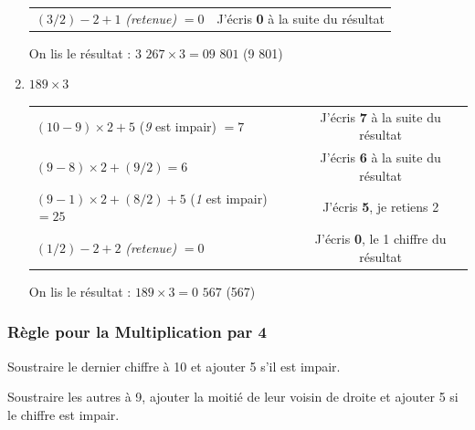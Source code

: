 \documentclass[a4paper, twoside]{article}
\begin{document}
\begin{small}
\begin{enumerate}
\begin{tabular}{l|c}
				\tabularnewline
				
				$(3 / 2) - 2 + 1$ \textit{(retenue)} $= 0$ & J'écris \textbf{0} à la suite du résultat
				
				\tabularnewline

			\end{tabular}
			
			On lis le résultat : {\boldmath $3$ $267 \times 3 = 09$ $801$} (9 801)\\




			\item $189 \times 3$
			
			\begin{tabular}{l|c}
			
				$(10 - 9) \times 2 + 5$ (\textit{9} est impair) $= 7$ & J'écris \textbf{7} à la suite du résultat
				
				\tabularnewline
				
				$(9 - 8) \times 2 + (9 / 2) = 6$ & J'écris \textbf{6} à la suite du résultat
				
				\tabularnewline
				
				$(9 - 1) \times 2 + (8 / 2) + 5$ (\textit{1} est impair) $= 25$ & J'écris \textbf{5}, je retiens 2
				
				\tabularnewline
				
				$(1 / 2) - 2 + 2$ \textit{(retenue)} $= 0$ & J'écris \textbf{0}, le 1\up{er} chiffre du résultat

			\end{tabular}
			
			On lis le résultat : {\boldmath $189 \times 3 = 0$ $567$} (567)\\

		\end{enumerate}
		\end{small}

		\vfill
		{\noindent \dotfill}

		\subsubsection*{Règle pour la Multiplication par 4}

		Soustraire le dernier chiffre à 10 et ajouter 5 s'il est impair. 

		Soustraire les autres à 9, ajouter la moitié de leur voisin de droite et ajouter 5 si le chiffre est impair.
\end{document}
